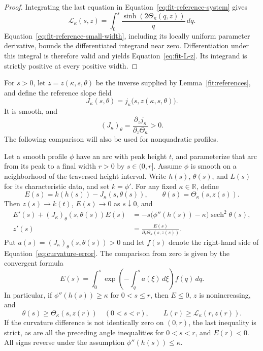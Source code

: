 \begin{proof}
Integrating the last equation in Equation~\eqref{eq:fit-reference-system}
gives
\[
 \mathcal L_\kappa(s,z)
   =\int_0^s\frac{\sinh(2\Theta_\kappa(q,z))}{q}\,dq.
\]
Equation~\eqref{eq:fit-reference-small-width}, including its locally
uniform parameter derivative, bounds the differentiated integrand
near zero.  Differentiation under this integral is therefore valid
and yields Equation~\eqref{eq:fit-L-z}.  Its integrand is strictly
positive at every positive width.
\end{proof}

For \(s>0\), let \(z=z(\kappa,s,\theta)\) be the inverse supplied by
Lemma~\ref{fit:references}, and define the reference slope field
\begin{equation}\label{eq:fit-slope-field}
 J_\kappa(s,\theta)
   =j_\kappa\bigl(s,z(\kappa,s,\theta)\bigr).
\end{equation}
It is smooth, and
\begin{equation}\label{eq:fit-field-positive}
 (J_\kappa)_\theta
   =\frac{\partial_z j_\kappa}{\partial_z\Theta_\kappa}>0.
\end{equation}
The following comparison will also be used for nonquadratic profiles.

\begin{lemma}\label{lem:curvature-comparison}
Let a smooth profile \(\phi\) have an arc with peak height \(t\), and
parameterize that arc from its peak to a final width \(r>0\) by
\(s\in(0,r]\).  Assume \(\phi\) is smooth on a neighborhood of the
traversed height interval.  Write \(h(s)\), \(\theta(s)\), and \(L(s)\)
for its characteristic data, and set \(k=\phi'\).  For any fixed
\(\kappa\in\mathbb R\), define
\[
 E(s)=k(h(s))-J_\kappa(s,\theta(s)),\qquad
 \theta(s)=\Theta_\kappa(s,z(s)).
\]
Then \(z(s)\to k(t)\), \(E(s)\to0\) as \(s\downarrow0\), and
\begin{align}
 E'(s)+(J_\kappa)_\theta(s,\theta(s))E(s)
  &=-s\bigl(\phi''(h(s))-\kappa\bigr)
       \operatorname{sech}^2\theta(s),
       \label{eq:curvature-error}\\
 z'(s)&=\frac{E(s)}{\partial_z\Theta_\kappa(s,z(s))}.
       \label{eq:label-derivative}
\end{align}
Put \(a(s)=(J_\kappa)_\theta(s,\theta(s))>0\) and let \(f(s)\)
denote the right-hand side of Equation~\eqref{eq:curvature-error}.
The comparison from zero is given by the convergent formula
\begin{equation}\label{eq:fit-error-integral}
 E(s)=\int_0^s
       \exp\left(-\int_q^s a(\xi)\,d\xi\right)f(q)\,dq.
\end{equation}
In particular, if \(\phi''(h(s))\ge\kappa\) for \(0<s\le r\), then
\(E\le0\), \(z\) is nonincreasing, and
\[
 \theta(s)\ge\Theta_\kappa(s,z(r))\quad(0<s<r),\qquad
 L(r)\ge\mathcal L_\kappa(r,z(r)).
\]
If the curvature difference is not identically zero on \((0,r)\),
the last inequality is strict, as are all the preceding angle
inequalities for \(0<s<r\), and \(E(r)<0\).
All signs reverse under the assumption \(\phi''(h(s))\le\kappa\).
\end{lemma}

